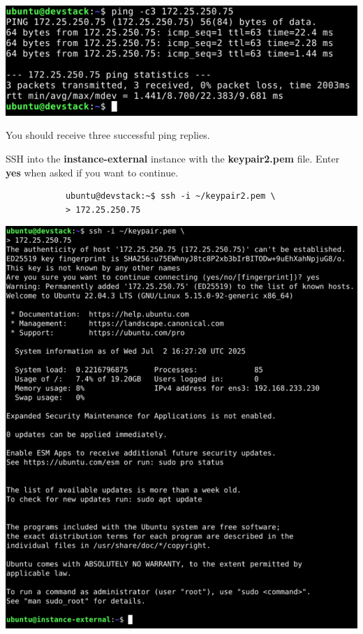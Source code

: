 \documentclass[letterpaper, 12pt]{article}
\begin{document}
\begin{enumerate}
\begin{labstep}
        \begin{center}
            \includegraphics[width=\linewidth]{images/part5/step40.png}
        \end{center}
    \end{labstep}

    \begin{notebox}
        You should receive three successful ping replies.
    \end{notebox}

    \begin{labstep}
        SSH into the \textbf{instance-external} instance with the \textbf{keypair2.pem} file.
        Enter \textbf{yes} when asked if you want to continue.
        \begin{lstlisting}
            ubuntu@devstack:~$ ssh -i ~/keypair2.pem \
            > 172.25.250.75
        \end{lstlisting}

        \begin{center}
            \includegraphics[width=\linewidth]{images/part5/step41.png}
        \end{center}
    \end{labstep}


\end{enumerate}
\end{document}
